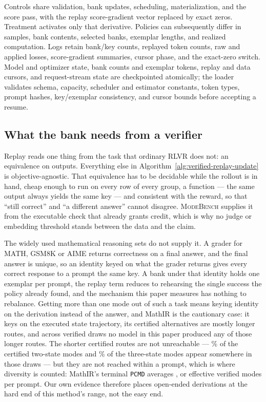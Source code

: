\documentclass{article}
\newcommand{\1}{\mathbf 1}
\newcommand{\mb}{\textsc{ModeBench}}
\newcommand{\pmd}{\texttt{PCMD}}
\theoremstyle{remark}
\theoremstyle{definition}
\theoremstyle{plain}
\begin{document}
Controls share validation, bank updates, scheduling, materialization, and
the score pass, with the replay score-gradient vector replaced by exact
zeros. Treatment activates only that derivative. Policies can subsequently
differ in samples, bank contents, selected banks, exemplar lengths, and
realized computation. Logs retain bank/key counts, replayed token counts,
raw and applied losses, score-gradient summaries, cursor phase, and the
exact-zero switch. Model and optimizer state, bank counts and exemplar
tokens, replay and data cursors, and request-stream state are checkpointed
atomically; the loader validates schema, capacity, scheduler and estimator
constants, token types, prompt hashes, key/exemplar consistency, and cursor
bounds before accepting a resume.

\subsection{What the bank needs from a verifier}
\label{app:algorithm-identity}

Replay reads one thing from the task that ordinary RLVR does not: an
equivalence on outputs. Everything else in Algorithm~\ref{alg:verified-replay-update}
is objective-agnostic. That equivalence has to be decidable while the rollout
is in hand, cheap enough to run on every row of every group, a function --- the
same output always yields the same key --- and consistent with the reward, so
that ``still correct'' and ``a different answer'' cannot disagree. \mb{}
supplies it from the executable check that already grants credit, which is why
no judge or embedding threshold stands between the data and the claim.

The widely used mathematical reasoning sets do not supply it. A grader for
MATH, GSM8K or AIME returns correctness on a final answer, and the final
answer is unique, so an identity keyed on what the grader returns gives every
correct response to a prompt the same key. A bank under that identity holds
one exemplar per prompt, the replay term reduces to rehearsing the single
success the policy already found, and the mechanism this paper measures has
nothing to rebalance. Getting more than one mode out of such a task means
keying identity on the derivation instead of the answer, and MathIR is the
cautionary case: it keys on the executed state trajectory, its certified
alternatives are mostly longer routes, and across \MIRdraws{} verified draws
no model in this paper produced any of those longer routes. The shorter
certified routes are not unreachable --- \MIRcovershort{}\% of the certified
two-state modes and \MIRcovermid{}\% of the three-state modes appear somewhere
in those draws --- but they are not reached within a prompt, which is where
diversity is counted: MathIR's terminal \pmd{} averages \MIRpmdafter{}, or
\MIRneffafter{} effective verified modes per prompt. Our own evidence therefore places open-ended derivations at the hard end
of this method's range, not the easy end.
\end{document}
